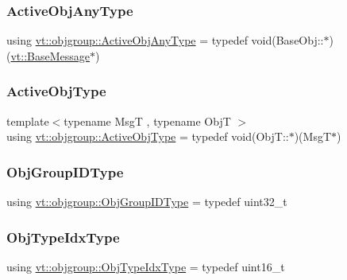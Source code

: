 \subsubsection{\texorpdfstring{Active\+Obj\+Any\+Type}{ActiveObjAnyType}}
{\footnotesize\ttfamily using \hyperlink{namespacevt_1_1objgroup_a25bec5d3c8e8bb02b62280eec62b8ac7}{vt\+::objgroup\+::\+Active\+Obj\+Any\+Type} = typedef void(Base\+Obj\+::$\ast$)(\hyperlink{namespacevt_ac34f95a5e2b8109b55bfba52b074443d}{vt\+::\+Base\+Message}$\ast$)}

\mbox{\label{namespacevt_1_1objgroup_a979bd9dc714fdacafc4b83f98271bc23}} 
\subsubsection{\texorpdfstring{Active\+Obj\+Type}{ActiveObjType}}
{\footnotesize\ttfamily template$<$typename MsgT , typename ObjT $>$ \\
using \hyperlink{namespacevt_1_1objgroup_a979bd9dc714fdacafc4b83f98271bc23}{vt\+::objgroup\+::\+Active\+Obj\+Type} = typedef void(Obj\+T\+::$\ast$)(MsgT$\ast$)}

\mbox{\label{namespacevt_1_1objgroup_a54a50ff6833bf618e5bedb9a3b6d0e07}} 
\subsubsection{\texorpdfstring{Obj\+Group\+I\+D\+Type}{ObjGroupIDType}}
{\footnotesize\ttfamily using \hyperlink{namespacevt_1_1objgroup_a54a50ff6833bf618e5bedb9a3b6d0e07}{vt\+::objgroup\+::\+Obj\+Group\+I\+D\+Type} = typedef uint32\+\_\+t}

\mbox{\label{namespacevt_1_1objgroup_a378e4b966221779c74f3a2f921eb2421}} 
\subsubsection{\texorpdfstring{Obj\+Type\+Idx\+Type}{ObjTypeIdxType}}
{\footnotesize\ttfamily using \hyperlink{namespacevt_1_1objgroup_a378e4b966221779c74f3a2f921eb2421}{vt\+::objgroup\+::\+Obj\+Type\+Idx\+Type} = typedef uint16\+\_\+t}



